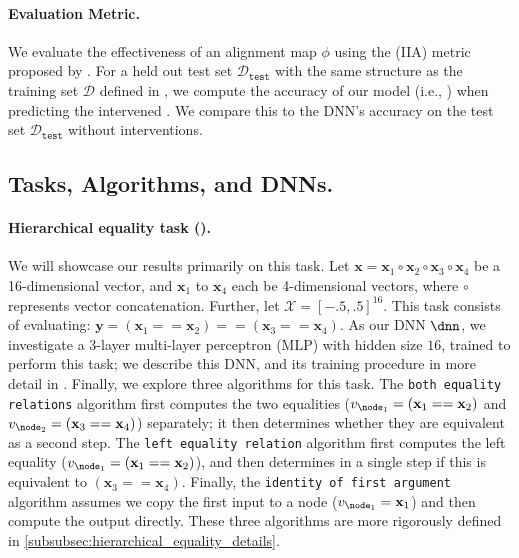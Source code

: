 \documentclass{article}
\newcommand{\prob}{p}
\newcommand{\bx}{\mathbf{x}}
\newcommand{\calX}{\mathcal{X}}
\newcommand{\by}{\mathbf{y}}
\newcommand{\calY}{\mathcal{Y}}
\newcommand{\nodevalue}{v}
\newcommand{\pdnncausal}{{\textcolor{\colourdnn}{\prob}}^{\causalmap}_{\dnn}}
\newcommand{\dataset}{\mathcal{D}}
\newcommand{\algname}[1]{\texttt{\fontsize{9pt}{9pt}\selectfont#1}}
\newcommand{\algbothequality}{\algname{both equality relations}\xspace}
\newcommand{\algleftequality}{\algname{left equality relation}\xspace}
\newcommand{\algidentityoffirst}{\algname{identity of first argument}\xspace}
\newcommand{\causalmap}{\phi}
\begin{document}
\paragraph{Evaluation Metric.}
We evaluate the effectiveness of an alignment map $\phi$ using the  (IIA) metric proposed by \citet{Geiger2023FindingAB}. 
For a held out test set $\dataset_{\mathtt{test}}$ with the same structure as the training set $\dataset$ defined in , we compute the accuracy of our model (i.e., \smash{$\argmax_{\by'\in \calY} \pdnncausal(\by' \mid \xnotinterveneddata,\interventiondata_{\dnn})$}) when predicting the intervened .
We compare this to the DNN's accuracy on the test set $\dataset_{\mathtt{test}}$ without interventions.%

\subsection{Tasks, Algorithms, and DNNs.}

\newcommand{\somename}{\mathtt{Name}}
\newcommand{\subject}{\mathtt{S}}
\newcommand{\indirectobject}{\mathtt{IO}}
\newcommand{\sometext}{\mathtt{[Text]}}
\newcommand{\exampletext}[1]{\emph{"#1"}}
\newcommand{\colored}[2]{\textcolor{#1}{#2}}

\paragraph{Hierarchical equality task (\citet{Geiger2023FindingAB}).}
We will showcase our results primarily on this task.
Let $\bx = \bx_1 \circ \bx_2 \circ \bx_3 \circ \bx_4$ be a 16-dimensional vector, and $\bx_1$ to $\bx_4$ each be 4-dimensional vectors, where $\circ$ represents vector concatenation.
Further, let $\calX = [-.5, .5]^{16}$.
This task consists of evaluating:
$\by = (\bx_1 == \bx_2) == (\bx_3 == \bx_4)$.
As our DNN $\dnn$, we investigate a 3-layer multi-layer perceptron (MLP) with hidden size $16$, trained to perform this task; we describe this DNN, and its training procedure in more detail in .
Finally, we explore three algorithms for this task.
The \algbothequality algorithm first computes the two equalities ($\nodevalue_{\node_1} = (\bx_1==\bx_2)$ and $\nodevalue_{\node_2} = (\bx_3==\bx_4)$) separately; it then determines whether they are equivalent as a second step. 
The \algleftequality algorithm first computes the left equality ($\nodevalue_{\node_1} = (\bx_1==\bx_2)$), and then determines in a single step if this is equivalent to $(\bx_3==\bx_4)$.
Finally, the \algidentityoffirst algorithm assumes we copy the first input to a node ($\nodevalue_{\node_1} = \bx_1$) and then compute the output directly.
These three algorithms are more rigorously defined in \cref{subsubsec:hierarchical_equality_details}.
\end{document}
